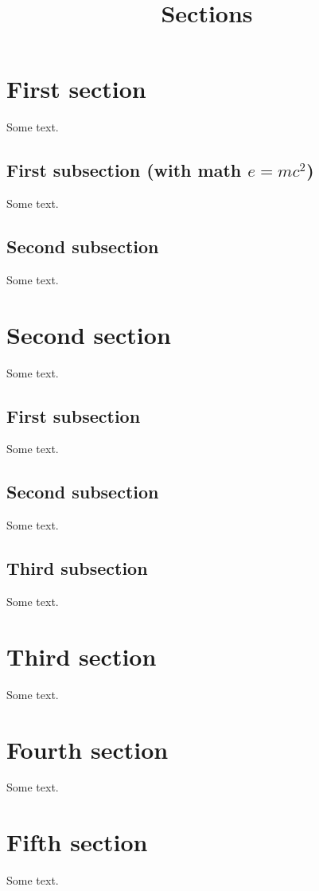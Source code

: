 \documentclass{amsart}
\title{Sections}
\begin{document}
\maketitle

\section{First section\label{sec1}}

Some text.

\subsection{First subsection (with math $e = mc^2$)}
Some text.

\subsection{Second subsection}

Some text.

\section{Second section}

Some text.

\subsection{First subsection}

Some text.

\subsection{\rm Second subsection}

Some text.

\subsection{{\rm Third subsection}}

Some text.

\section{Third section}

Some text.

\section{Fourth section}

Some text.

\section{Fifth section}

Some text.
\end{document}
